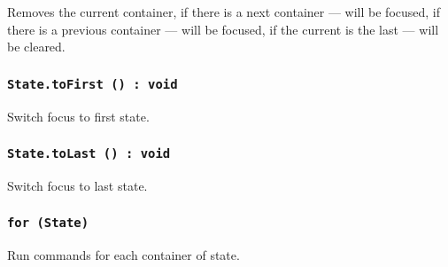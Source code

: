 Removes the current container, if there is a next container — will be focused, if there is a previous container — will be focused, if the current is the last — will be cleared.

\subsubsection{\texttt{State.toFirst () : void}}

Switch focus to first state.

\subsubsection{\texttt{State.toLast () : void}}

Switch focus to last state.

\subsubsection{\texttt{for (State) {}}}

Run commands for each container of state.
